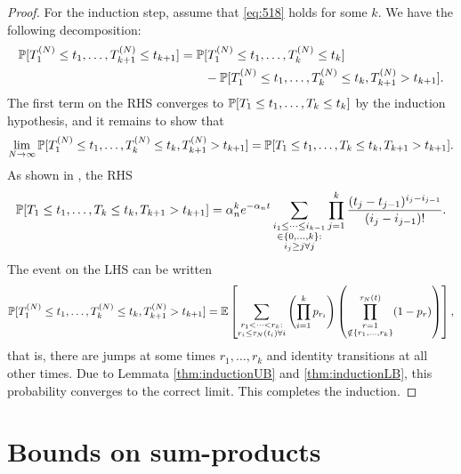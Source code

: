 \begin{proof}
For the induction step, assume that \eqref{eq:518} holds for some $k$. 
We have the following decomposition:
\begin{align*}
\mathbb{P}[ T_1^{(N)} \leq t_1, \dots , T_{k+1}^{(N)} \leq t_{k+1} ]
&= \mathbb{P}[ T_1^{(N)} \leq t_1, \dots , T_k^{(N)} \leq t_k ] \\
        &\qquad- \mathbb{P}[ T_1^{(N)} \leq t_1, \dots , T_k^{(N)} \leq t_k, T_{k+1}^{(N)} > t_{k+1} ] .
\end{align*}
The first term on the RHS converges to $\mathbb{P}[ T_1 \leq t_1, \dots , T_k \leq t_k ]$ by the induction hypothesis, and it remains to show that
\begin{equation*}
\lim_{N\to\infty} 
        \mathbb{P}[ T_1^{(N)} \leq t_1, \dots , T_k^{(N)} \leq t_k, T_{k+1}^{(N)} > t_{k+1} ]
= \mathbb{P}[ T_1\leq t_1, \dots , T_k \leq t_k, T_{k+1} > t_{k+1} ] .
\end{equation*}
As shown in \textcite{mohle1999}, the RHS
\begin{equation*}
\mathbb{P}[ T_1\leq t_1, \dots , T_k \leq t_k, T_{k+1} > t_{k+1} ]
= \alpha_n^k e^{-\alpha_n t} 
        \sum_{\substack{i_1\leq \dots\leq i_{k-1}\\ \in \{0,\dots,k\} :
        \\ i_j \geq j \forall j}} 
        \prod_{j=1}^k \frac{(t_j - t_{j-1})^{i_j - i_{j-1}}}{(i_j - i_{j-1})! } .
\end{equation*}
The event on the LHS can be written \parencite{mohle1999}
\begin{equation*}
\mathbb{P}[ T_1^{(N)} \leq t_1, \dots , T_k^{(N)} \leq t_k, T_{k+1}^{(N)} > t_{k+1} ]
= \mathbb{E} \left[ \sum_{\substack{r_1 <\dots< r_k :\\ r_i \leq \tau_N(t_i) \forall i}}
        \left( \prod_{i=1}^k p_{r_i} \right)
        \left( \prod_{\substack{r=1 \\ \notin \{r_1,\dots,r_k\} }}^{\tau_N(t)} 
        (1-p_r) \right) \right] ,
\end{equation*}
that is, there are jumps at some times $r_1, \dots, r_k$ and identity transitions at all other times.
Due to Lemmata \ref{thm:inductionUB} and \ref{thm:inductionLB}, this probability converges to the correct limit.
This completes the induction.
\end{proof}




\section{Bounds on sum-products \seb{$\checkmark$} }

